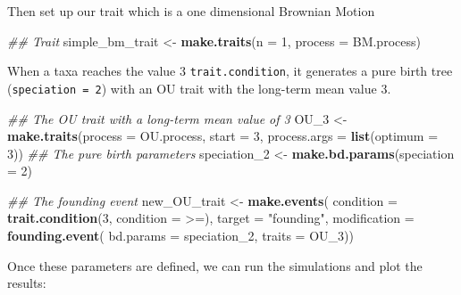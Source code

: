 \documentclass[
]{book}
\newenvironment{Shaded}{\begin{snugshade}}{\end{snugshade}}
\newcommand{\CommentTok}[1]{\textcolor[rgb]{0.56,0.35,0.01}{\textit{#1}}}
\newcommand{\DataTypeTok}[1]{\textcolor[rgb]{0.13,0.29,0.53}{#1}}
\newcommand{\DecValTok}[1]{\textcolor[rgb]{0.00,0.00,0.81}{#1}}
\newcommand{\KeywordTok}[1]{\textcolor[rgb]{0.13,0.29,0.53}{\textbf{#1}}}
\newcommand{\NormalTok}[1]{#1}
\newcommand{\StringTok}[1]{\textcolor[rgb]{0.31,0.60,0.02}{#1}}
\begin{document}
Then set up our trait which is a one dimensional Brownian Motion

\begin{Shaded}
\begin{Highlighting}[]
\CommentTok{\#\# Trait}
\NormalTok{simple\_bm\_trait \textless{}{-}}\StringTok{ }\KeywordTok{make.traits}\NormalTok{(}\DataTypeTok{n =} \DecValTok{1}\NormalTok{, }\DataTypeTok{process =}\NormalTok{ BM.process)}
\end{Highlighting}
\end{Shaded}

When a taxa reaches the value 3 \texttt{trait.condition}, it generates a pure birth tree (\texttt{speciation\ =\ 2}) with an OU trait with the long-term mean value 3.

\begin{Shaded}
\begin{Highlighting}[]
\CommentTok{\#\# The OU trait with a long{-}term mean value of 3}
\NormalTok{OU\_}\DecValTok{3}\NormalTok{ \textless{}{-}}\StringTok{ }\KeywordTok{make.traits}\NormalTok{(}\DataTypeTok{process =}\NormalTok{ OU.process,}
                    \DataTypeTok{start =} \DecValTok{3}\NormalTok{, }\DataTypeTok{process.args =} \KeywordTok{list}\NormalTok{(}\DataTypeTok{optimum =} \DecValTok{3}\NormalTok{))}
\CommentTok{\#\# The pure birth parameters}
\NormalTok{speciation\_}\DecValTok{2}\NormalTok{ \textless{}{-}}\StringTok{ }\KeywordTok{make.bd.params}\NormalTok{(}\DataTypeTok{speciation =} \DecValTok{2}\NormalTok{)}

\CommentTok{\#\# The founding event}
\NormalTok{new\_OU\_trait \textless{}{-}}\StringTok{ }\KeywordTok{make.events}\NormalTok{(}
                    \DataTypeTok{condition    =} \KeywordTok{trait.condition}\NormalTok{(}\DecValTok{3}\NormalTok{, }\DataTypeTok{condition =} \StringTok{\textasciigrave{}}\DataTypeTok{\textgreater{}=}\StringTok{\textasciigrave{}}\NormalTok{),}
                    \DataTypeTok{target       =} \StringTok{"founding"}\NormalTok{,}
                    \DataTypeTok{modification =} \KeywordTok{founding.event}\NormalTok{(}
                                    \DataTypeTok{bd.params =}\NormalTok{ speciation\_}\DecValTok{2}\NormalTok{,}
                                    \DataTypeTok{traits    =}\NormalTok{ OU\_}\DecValTok{3}\NormalTok{))}
\end{Highlighting}
\end{Shaded}

Once these parameters are defined, we can run the simulations and plot the results:
\end{document}
